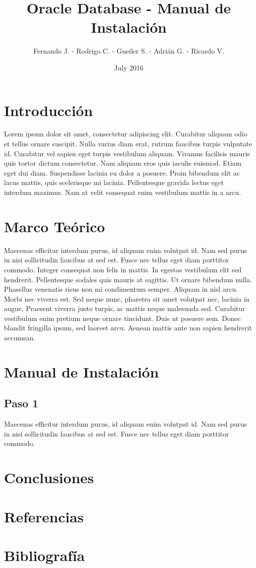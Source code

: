 \documentclass{article}
\title{Oracle Database - Manual de Instalación}
\author{Fernando J. - Rodrigo C. - Gueiler S. - Adrián G. - Ricardo V.}
\date{July 2016}
\begin{document}
\maketitle

\section{Introducción}
Lorem ipsum dolor sit amet, consectetur adipiscing elit. Curabitur aliquam odio et tellus ornare suscipit. Nulla varius diam erat, rutrum faucibus turpis vulputate id. Curabitur vel sapien eget turpis vestibulum aliquam. Vivamus facilisis mauris quis tortor dictum consectetur. Nam aliquam eros quis iaculis euismod. Etiam eget dui diam. Suspendisse lacinia eu dolor a posuere. Proin bibendum elit ac lacus mattis, quis scelerisque mi lacinia. Pellentesque gravida lectus eget interdum maximus. Nam at velit consequat enim vestibulum mattis in a arcu.

\section{Marco Teórico}
Maecenas efficitur interdum purus, id aliquam enim volutpat id. Nam sed purus in nisi sollicitudin faucibus at sed est. Fusce nec tellus eget diam porttitor commodo. Integer consequat non felis in mattis. In egestas vestibulum elit sed hendrerit. Pellentesque sodales quis mauris at sagittis. Ut ornare bibendum nulla. Phasellus venenatis risus non mi condimentum semper. Aliquam in nisl arcu. Morbi nec viverra est. Sed neque nunc, pharetra sit amet volutpat nec, lacinia in augue. Praesent viverra justo turpis, ac mattis neque malesuada sed. Curabitur vestibulum enim pretium neque ornare tincidunt. Duis ut posuere sem. Donec blandit fringilla ipsum, sed laoreet arcu. Aenean mattis ante non sapien hendrerit accumsan.

\section{Manual de Instalación}
\subsection {Paso 1}
Maecenas efficitur interdum purus, id aliquam enim volutpat id. Nam sed purus in nisi sollicitudin faucibus at sed est. Fusce nec tellus eget diam porttitor commodo.

\section{Conclusiones}

\section{Referencias}

\section{Bibliografía}
\end{document}
